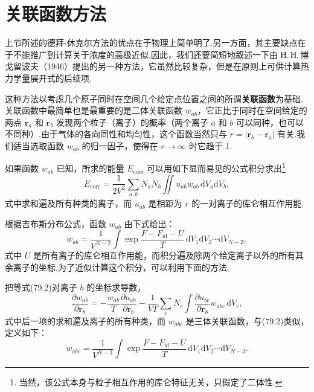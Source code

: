 \section{关联函数方法}

上节所述的德拜-休克尔方法的优点在于物理上简单明了.另一方面，其主要缺点在于不能推广到计算关于浓度的高级近似.因此，我们还要简短地叙述一下由 Н.\,Н.\,博戈留波夫（1946）提出的另一种方法，它虽然比较复杂，但是在原则上可供计算热力学量展开式的后续项.

这种方法以考虑几个原子同时在空间几个给定点位置之间的所谓\textbf{关联函数}为基础.关联函数中最简单也是最重要的是二体关联函数 $w_{ab}$，它正比于同时在空间给定的两点 $\boldsymbol{r}_a$ 和 $\boldsymbol{r}_b$ 发现两个粒子（离子）的概率（两个离子 $a$ 和 $b$ 可以同种，也可以不同种）.由于气体的各向同性和均匀性，这个函数当然只与 $r=\left|\boldsymbol{r}_b-\boldsymbol{r}_a\right|$ 有关.我们适当选取函数 $w_{ab}$ 的归一因子，使得在 $r\to\infty$ 时它趋于 1.

如果函数 $w_{ab}$ 已知，所求的能量 $E_{\mathrm{corr}}$ 可以用如下显而易见的公式积分求出\footnote{当然，该公式本身与粒子相互作用的库仑特征无关，只假定了二体性.}
\begin{equation}
  E_{\mathrm{corr}}=\frac{1}{2V^2}\sum_{a,b}N_aN_b
  \iint u_{ab}w_{ab}\,\mathrm{d}V_a\mathrm{d}V_b,
\end{equation}
式中求和遍及所有种类的离子，而 $u_{ab}$ 是相距为 $r$ 的一对离子的库仑相互作用能.

根据吉布斯分布公式，函数 $w_{ab}$ 由下式给出：
\begin{equation}
  w_{ab}=\frac{1}{V^{N-2}}\int\exp\frac{F-F_{\mathrm{id}}-U}{T}\,
  \mathrm{d}V_1\mathrm{d}V_2\cdots\mathrm{d}V_{N-2},
\end{equation}
式中 $U$ 是所有离子的库仑相互作用能，而积分遍及除两个给定离子以外的所有其余离子的坐标.为了近似计算这个积分，可以利用下面的方法.

把等式(79.2)对离子 $b$ 的坐标求导数，
\begin{equation}
  \frac{\partial w_{ab}}{\partial\boldsymbol{r}_b}
  =-\frac{w_{ab}}{T}\frac{\partial u_{ab}}{\partial\boldsymbol{r}_b}
  -\frac{1}{VT}\sum_cN_c\int\frac{\partial u_{bc}}{\partial\boldsymbol{r}_b}
  w_{abc}\,\mathrm{d}V_c,
\end{equation}
式中后一项的求和遍及离子的所有种类，而 $w_{abc}$ 是三体关联函数，与(79.2)类似，定义如下：
\begin{equation*}
  w_{abc}=\frac{1}{V^{N-3}}\int\exp\frac{F-F_{\mathrm{id}}-U}{T}\,
  \mathrm{d}V_1\mathrm{d}V_2\cdots\mathrm{d}V_{N-3}.
\end{equation*}

